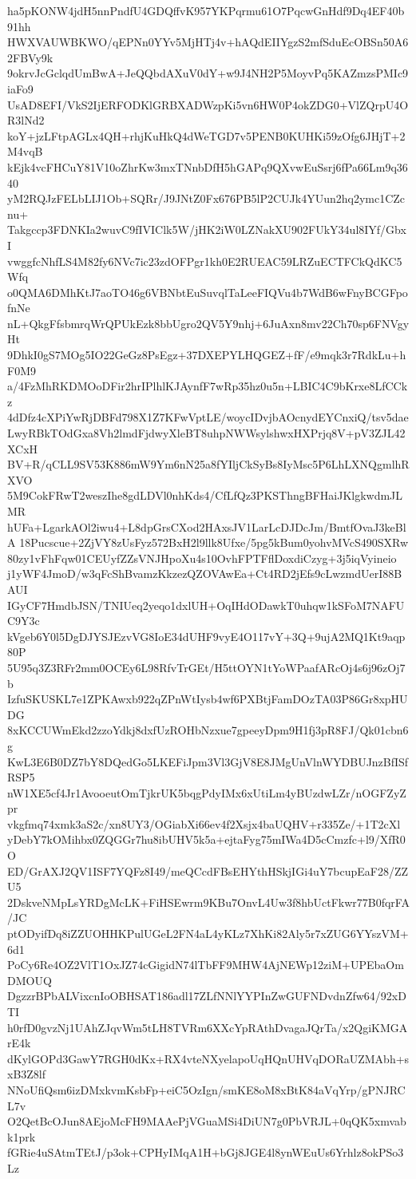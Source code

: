 ha5pKONW4jdH5nnPndfU4GDQffvK957YKPqrmu61O7PqcwGnHdf9Dq4EF40b91hh
HWXVAUWBKWO/qEPNn0YYv5MjHTj4v+hAQdEIIYgzS2mfSduEcOBSn50A62FBVy9k
9okrvJcGclqdUmBwA+JeQQbdAXuV0dY+w9J4NH2P5MoyvPq5KAZmzsPMIc9iaFo9
UsAD8EFI/VkS2IjERFODKlGRBXADWzpKi5vn6HW0P4okZDG0+VlZQrpU4OR3lNd2
koY+jzLFtpAGLx4QH+rhjKuHkQ4dWeTGD7v5PENB0KUHKi59zOfg6JHjT+2M4vqB
kEjk4vcFHCuY81V10oZhrKw3mxTNnbDfH5hGAPq9QXvwEuSsrj6fPa66Lm9q3640
yM2RQJzFELbLIJ1Ob+SQRr/J9JNtZ0Fx676PB5lP2CUJk4YUun2hq2ymc1CZcnu+
Takgccp3FDNKIa2wuvC9fIVIClk5W/jHK2iW0LZNakXU902FUkY34ul8IYf/GbxI
vwggfcNhfLS4M82fy6NVc7ic23zdOFPgr1kh0E2RUEAC59LRZuECTFCkQdKC5Wfq
o0QMA6DMhKtJ7aoTO46g6VBNbtEuSuvqlTaLeeFIQVu4b7WdB6wFnyBCGFpofnNe
nL+QkgFfsbmrqWrQPUkEzk8bbUgro2QV5Y9nhj+6JuAxn8mv22Ch70sp6FNVgyHt
9DhkI0gS7MOg5IO22GeGz8PsEgz+37DXEPYLHQGEZ+fF/e9mqk3r7RdkLu+hF0M9
a/4FzMhRKDMOoDFir2hrIPlhlKJAynfF7wRp35hz0u5n+LBIC4C9bKrxe8LfCCkz
4dDfz4cXPiYwRjDBFd798X1Z7KFwVptLE/woycIDvjbAOcnydEYCnxiQ/tsv5dae
LwyRBkTOdGxa8Vh2lmdFjdwyXleBT8uhpNWWsylshwxHXPrjq8V+pV3ZJL42XCxH
BV+R/qCLL9SV53K886mW9Ym6nN25a8fYIljCkSyBs8IyMsc5P6LhLXNQgmlhRXVO
5M9CokFRwT2weszIhe8gdLDVl0nhKds4/CfLfQz3PKSThngBFHaiJKlgkwdmJLMR
hUFa+LgarkAOl2iwu4+L8dpGrsCXod2HAxsJV1LarLcDJDcJm/BmtfOvaJ3keBlA
18Pucscue+2ZjVY8zUsFyz572BxH2l9llk8Ufxe/5pg5kBum0yohvMVcS490SXRw
80zy1vFhFqw01CEUyfZZsVNJHpoXu4s10OvhFPTFflDoxdiCzyg+3j5iqVyineio
j1yWF4JmoD/w3qFcShBvamzKkzezQZOVAwEa+Ct4RD2jEfs9cLwzmdUerI88BAUI
IGyCF7HmdbJSN/TNIUeq2yeqo1dxlUH+OqIHdODawkT0uhqw1kSFoM7NAFUC9Y3c
kVgeb6Y0l5DgDJYSJEzvVG8IoE34dUHF9vyE4O117vY+3Q+9ujA2MQ1Kt9aqp80P
5U95q3Z3RFr2mm0OCEy6L98RfvTrGEt/H5ttOYN1tYoWPaafARcOj4s6j96zOj7b
IzfuSKUSKL7e1ZPKAwxb922qZPnWtIysb4wf6PXBtjFamDOzTA03P86Gr8xpHUDG
8xKCCUWmEkd2zzoYdkj8dxfUzROHbNzxue7gpeeyDpm9H1fj3pR8FJ/Qk01cbn6g
KwL3E6B0DZ7bY8DQedGo5LKEFiJpm3Vl3GjV8E8JMgUnVlnWYDBUJnzBfISfRSP5
nW1XE5cf4Jr1AvooeutOmTjkrUK5bqgPdyIMx6xUtiLm4yBUzdwLZr/nOGFZyZpr
vkgfmq74xmk3aS2c/xn8UY3/OGiabXi66ev4f2Xsjx4baUQHV+r335Ze/+1T2cXl
yDebY7kOMihbx0ZQGGr7hu8ibUHV5k5a+ejtaFyg75mIWa4D5cCmzfc+l9/XfR0O
ED/GrAXJ2QV1ISF7YQFz8I49/meQCcdFBsEHYthHSkjIGi4uY7bcupEaF28/ZZU5
2DskveNMpLsYRDgMcLK+FiHSEwrm9KBu7OnvL4Uw3f8hbUctFkwr77B0fqrFA/JC
ptODyifDq8iZZUOHHKPulUGeL2FN4aL4yKLz7XhKi82Aly5r7xZUG6YYszVM+6d1
PoCy6Re4OZ2VlT1OxJZ74cGigidN74lTbFF9MHW4AjNEWp12ziM+UPEbaOmDMOUQ
DgzzrBPbALVixcnIoOBHSAT186adl17ZLfNNlYYPInZwGUFNDvdnZfw64/92xDTI
h0rfD0gvzNj1UAhZJqvWm5tLH8TVRm6XXcYpRAthDvagaJQrTa/x2QgiKMGArE4k
dKylGOPd3GawY7RGH0dKx+RX4vteNXyelapoUqHQnUHVqDORaUZMAbh+sxB3Z8lf
NNoUfiQsm6izDMxkvmKsbFp+eiC5OzIgn/smKE8oM8xBtK84aVqYrp/gPNJRCL7v
O2QetBcOJun8AEjoMcFH9MAAePjVGuaMSi4DiUN7g0PbVRJL+0qQK5xmvabk1prk
fGRie4uSAtmTEtJ/p3ok+CPHyIMqA1H+bGj8JGE4l8ynWEuUs6Yrhlz8okPSo3Lz
